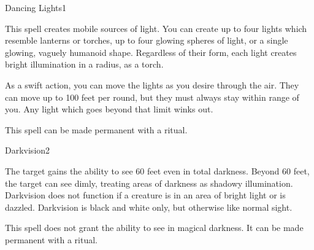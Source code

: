 \begin{spellsection}{Dancing Lights}{1}
\begin{spellheader}
\end{spellheader}
\begin{spellcontent}
    \begin{spelltargetinginfo}
        \spellrng{\rngmed}
    \end{spelltargetinginfo}
    \begin{spelleffects}
        \spelleffect This spell creates mobile sources of light. You can create up to four lights which resemble lanterns or torches, up to four glowing spheres of light, or a single glowing, vaguely humanoid shape. Regardless of their form, each light creates bright illumination in a \areamed radius, as a torch.

        As a swift action, you can move the lights as you desire through the air. They can move up to 100 feet per round, but they must always stay within range of you. Any light which goes beyond that limit winks out.
        \spelldur \durshort \dismissable
    \end{spelleffects}
\end{spellcontent}
\begin{spellfooter}
    \spellnotes This spell can be made permanent with a  ritual.
\end{spellfooter}
\end{spellsection}

\begin{spellsection}{Darkvision}{2}
\begin{spellheader}
\end{spellheader}
\begin{spellcontent}
    \begin{spelltargetinginfo}
    \end{spelltargetinginfo}
    \begin{spelleffects}
        \spelleffect The target gains the ability to see 60 feet even in total darkness. Beyond 60 feet, the target can see dimly, treating areas of darkness as shadowy illumination. Darkvision does not function if a creature is in an area of bright light or is dazzled. Darkvision is black and white only, but otherwise like normal sight.
        \spelldur \durlong
    \end{spelleffects}
\end{spellcontent}
\begin{spellfooter}
    \spellnotes This spell does not grant the ability to see in magical darkness. It can be made permanent with a  ritual.
\end{spellfooter}
\end{spellsection}

